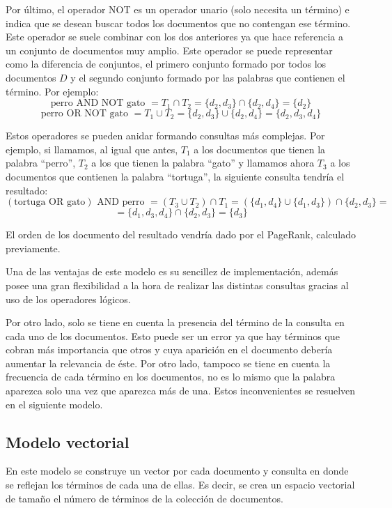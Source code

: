 \documentclass[size=a4, parskip=half, titlepage=false, toc=flat, toc=bib, 12pt, twoside]{scrartcl}
\theoremstyle{theorem-style}
\theoremstyle{definition-style}
\theoremstyle{remark-style}
\theoremstyle{example-style}
\theoremstyle{definition-style}
\theoremstyle{remark-style}
\begin{document}
Por último, el operador NOT es un operador unario (solo necesita un término) e indica que se desean buscar todos los documentos que no contengan ese término. Este operador se suele combinar con los dos anteriores ya que hace referencia a un conjunto de documentos muy amplio. Este operador se puede representar como la diferencia de conjuntos, el primero conjunto formado por todos los documentos $D$ y el segundo conjunto formado por las palabras que contienen el término. Por ejemplo:
$$\textrm{perro AND NOT gato } = T_1 \cap T_2 = \{d_2, d_3\} \cap \{d_2, d_4\} = \{d_2\}$$
$$\textrm{perro OR NOT gato } = T_1 \cup T_2 = \{d_2, d_3\} \cup \{d_2, d_4\} = \{d_2, d_3, d_4\}$$

Estos operadores se pueden anidar formando consultas más complejas. Por ejemplo, si llamamos, al igual que antes, $T_1$ a los documentos que tienen la palabra ``perro'', $T_2$ a los que tienen la palabra ``gato'' y llamamos ahora $T_3$ a los documentos que contienen la palabra ``tortuga'', la siguiente consulta tendría el resultado:
$$(\textrm{tortuga OR gato}) \textrm{ AND perro } = (T_3 \cup T_2) \cap T_1 = (\{d_1, d_4\} \cup \{d_1, d_3\}) \cap \{d_2, d_3\} =$$ $$= \{d_1, d_3, d_4\} \cap \{d_2 , d_3\} = \{d_3\} $$

El orden de los documento del resultado vendría dado por el PageRank, calculado previamente.

Una de las ventajas de este modelo es su sencillez de implementación, además posee una gran flexibilidad a la hora de realizar las distintas consultas gracias al uso de los operadores lógicos.

Por otro lado, solo se tiene en cuenta la presencia del término de la consulta en cada uno de los documentos. Esto puede ser un error ya que hay términos que cobran más importancia que otros y cuya aparición en el documento debería aumentar la relevancia de éste. Por otro lado, tampoco se tiene en cuenta la frecuencia de cada término en los documentos, no es lo mismo que la palabra aparezca solo una vez que aparezca más de una. Estos inconvenientes se resuelven en el siguiente modelo.

\subsection{Modelo vectorial}
En este modelo se construye un vector por cada documento y consulta en donde se reflejan los términos de cada una de ellas. Es decir, se crea un espacio vectorial de tamaño el número de términos de la colección de documentos.
\end{document}

